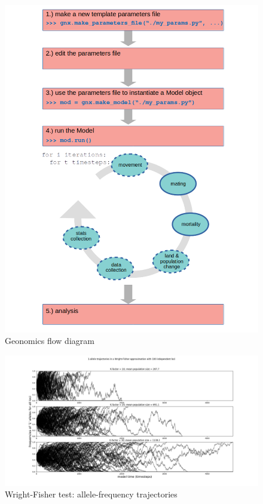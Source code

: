 ﻿\documentclass{article}
\begin{document}
\begin{figure}[h!]
\includegraphics[width=125mm]{./img/flow_diagram.png}
\caption{Geonomics flow diagram}
\end{figure}


\begin{figure}[h!]
\includegraphics[width=175mm]{./img/validation/wf/allele_trajectories.png}
        \caption{Wright-Fisher test: allele-frequency trajectories}
\end{figure}
\end{document}

